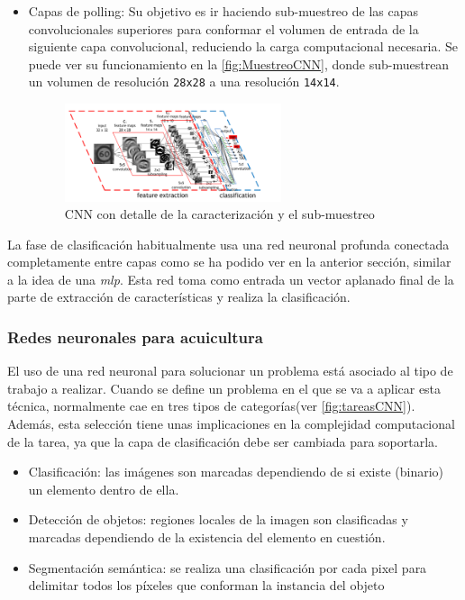 \begin{itemize}
    \item Capas de polling: Su objetivo es ir haciendo sub-muestreo de las capas convolucionales superiores para conformar el volumen de entrada de la siguiente capa convolucional, reduciendo la carga computacional necesaria. 
    Se puede ver su funcionamiento en la \autoref{fig:MuestreoCNN}, donde sub-muestrean un volumen de resolución \texttt{28x28} a una resolución \texttt{14x14}.
    \begin{figure}[H]
        \centering
        \includegraphics[width=0.6\textwidth]{images/4/EjemploPolling.png}
        \caption{CNN con detalle de la caracterización y el sub-muestreo\cite{ConvolutionalNeuralNetwork}}
        \label{fig:MuestreoCNN}
    \end{figure}

\end{itemize}

La fase de clasificación habitualmente usa una red neuronal profunda conectada completamente entre capas como se ha podido ver en la anterior sección, similar a la idea de una \textit{\acrshort{mlp}}. Esta 
red toma como entrada un vector aplanado final de la parte de extracción de características y realiza la clasificación.

\subsubsection{Redes neuronales para acuicultura}

El uso de una red neuronal para solucionar un problema está asociado al tipo de trabajo a realizar. Cuando se define un problema en el que se va a aplicar esta técnica, normalmente cae en tres tipos de 
categorías(ver \autoref{fig:tareasCNN}). Además, esta selección tiene unas implicaciones en la complejidad computacional de la tarea, ya que la capa de clasificación debe ser cambiada para soportarla.

\begin{itemize}
    \item Clasificación: las imágenes son marcadas dependiendo de si existe (binario) un elemento dentro de ella.
    \item Detección de objetos: regiones locales de la imagen son clasificadas y marcadas dependiendo de la existencia del elemento en cuestión.
    \item Segmentación semántica: se realiza una clasificación por cada pixel para delimitar todos los píxeles que conforman la instancia del objeto
\end{itemize}

